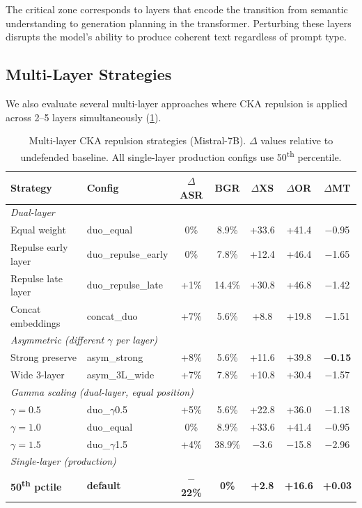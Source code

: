The critical zone corresponds to layers that encode the transition from semantic understanding to generation planning in the transformer. Perturbing these layers disrupts the model's ability to produce coherent text regardless of prompt type.

\subsection{Multi-Layer Strategies}

We also evaluate several multi-layer approaches where CKA repulsion is applied across 2--5 layers simultaneously (\cref{tab:multilayer}).

\begin{table}[h]
\centering
\setlength{\tabcolsep}{4pt}
\renewcommand{\arraystretch}{1.1}
\caption{Multi-layer CKA repulsion strategies (Mistral-7B). $\Delta$ values relative to undefended baseline. All single-layer production configs use 50\textsuperscript{th} percentile.}
\label{tab:multilayer}
\begin{tabular}{@{}llccccc@{}}
\toprule
\textbf{Strategy} & \textbf{Config} & \textbf{$\Delta$ASR} & \textbf{BGR} & \textbf{$\Delta$XS} & \textbf{$\Delta$OR} & \textbf{$\Delta$MT} \\
\midrule
\multicolumn{7}{l}{\textit{Dual-layer}} \\
\quad Equal weight & duo\_equal & 0\% & 8.9\% & +33.6 & +41.4 & $-$0.95 \\
\quad Repulse early layer & duo\_repulse\_early & 0\% & 7.8\% & +12.4 & +46.4 & $-$1.65 \\
\quad Repulse late layer & duo\_repulse\_late & +1\% & 14.4\% & +30.8 & +46.8 & $-$1.42 \\
\quad Concat embeddings & concat\_duo & +7\% & 5.6\% & +8.8 & +19.8 & $-$1.51 \\
\midrule
\multicolumn{7}{l}{\textit{Asymmetric (different $\gamma$ per layer)}} \\
\quad Strong preserve & asym\_strong & +8\% & 5.6\% & +11.6 & +39.8 & $-$\textbf{0.15} \\
\quad Wide 3-layer & asym\_3L\_wide & +7\% & 7.8\% & +10.8 & +30.4 & $-$1.57 \\
\midrule
\multicolumn{7}{l}{\textit{Gamma scaling (dual-layer, equal position)}} \\
\quad $\gamma = 0.5$ & duo\_$\gamma$0.5 & +5\% & 5.6\% & +22.8 & +36.0 & $-$1.18 \\
\quad $\gamma = 1.0$ & duo\_equal & 0\% & 8.9\% & +33.6 & +41.4 & $-$0.95 \\
\quad $\gamma = 1.5$ & duo\_$\gamma$1.5 & +4\% & 38.9\% & $-$3.6 & $-$15.8 & $-$2.96 \\
\midrule
\multicolumn{7}{l}{\textit{Single-layer (production)}} \\
\quad \textbf{50\textsuperscript{th} pctile} & \textbf{default} & \textbf{$-$22\%} & \textbf{0\%} & \textbf{+2.8} & \textbf{+16.6} & \textbf{+0.03} \\
\bottomrule
\end{tabular}
\renewcommand{\arraystretch}{1.0}
\end{table}

